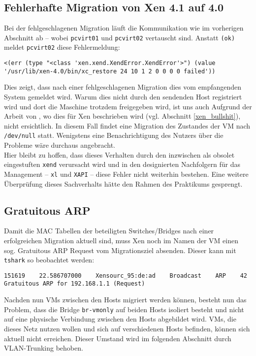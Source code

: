 \subsection{Fehlerhafte Migration von Xen 4.1 auf 4.0}
Bei der fehlgeschlagenen Migration läuft die Kommunikation wie im vorherigen Abschnitt ab -- wobei \verb#pcvirt01# und \verb#pcvirt02# vertauscht sind. Anstatt \verb#(ok)# meldet \verb#pcvirt02# diese Fehlermeldung:
\setupVerbatimOut
\begin{verbatim}
<(err (type "<class 'xen.xend.XendError.XendError'>") (value '/usr/lib/xen-4.0/bin/xc_restore 24 10 1 2 0 0 0 0 failed'))
\end{verbatim}

Dies zeigt, dass nach einer fehlgeschlagenen Migration dies vom empfangenden System gemeldet wird. Warum dies nicht durch den sendenden Host registriert wird und dort die Maschine trotzdem freigegeben wird, ist uns auch Aufgrund der Arbeit von \cite{clark2005live}, wo dies für Xen beschrieben wird (vgl. Abschnitt \ref{xen_bullshit}), nicht ersichtlich. In diesem Fall findet eine Migration des Zustandes der VM nach \verb#/dev/null# statt. Wenigstens eine Benachrichtigung des Nutzers über die Probleme wäre durchaus angebracht.
\\
Hier bleibt zu hoffen, dass dieses Verhalten durch den inzwischen als obsolet eingestuften \verb#xend# verursacht wird und in den designierten Nachfolgern für das Management -- \verb#xl# und \verb#XAPI# -- diese Fehler nicht weiterhin bestehen. Eine weitere Überprüfung dieses Sachverhalts hätte den Rahmen des Praktikums gesprengt.

\subsection{Gratuitous ARP}
\label{Gratuitous}

Damit die MAC Tabellen der beteiligten Switches/Bridges nach einer erfolgreichen Migration aktuell sind, muss Xen noch im Namen der VM einen sog. Gratuitous ARP Request vom Migrationsziel absenden. Dieser kann mit \verb#tshark# so beobachtet werden:

\setupVerbatimOut
\begin{verbatim}
151619    22.586707000    Xensourc_95:de:ad    Broadcast    ARP    42    Gratuitous ARP for 192.168.1.1 (Request)
\end{verbatim}

Nachden nun VMs zwischen den Hosts migriert werden können, besteht nun das Problem, dass die Bridge \verb#br-vmonly# auf beiden Hosts isoliert besteht und nicht auf eine physische Verbindung zwischen den Hosts abgebildet wird. VMs, die dieses Netz nutzen wollen und sich auf verschiedenen Hosts befinden, können sich aktuell nicht erreichen. Dieser Umstand wird im folgenden Abschnitt durch VLAN-Trunking behoben.

